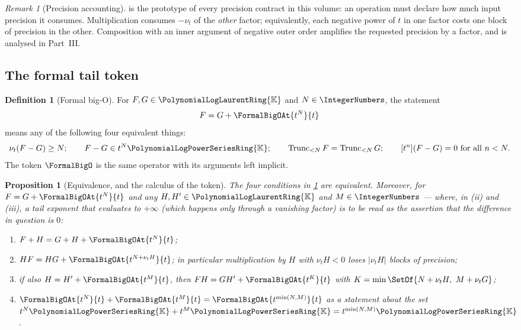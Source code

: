 \documentclass[11pt,oneside]{article}
\theoremstyle{plain}
\newtheorem{proposition}[theorem]{Proposition}
\theoremstyle{definition}
\newtheorem{definition}[theorem]{Definition}
\theoremstyle{remark}
\newtheorem{remark}[theorem]{Remark}
\newcommand{\K}{\mathbb{K}}
\newcommand{\PLpow}{\PolynomialLogPowerSeriesRing{\K}}   %
\newcommand{\PLlau}{\PolynomialLogLaurentRing{\K}}       %
\newcommand{\ordt}{\nu_{t}}                              %
\newcommand{\Trunc}[2]{\operatorname{Trunc}_{<#2}#1}     %
\begin{document}
\begin{remark}[Precision accounting]
\label{plt:rmk:trunc-precision}
 is the prototype of every precision contract in
this volume: an operation must declare how much input precision it consumes.
Multiplication consumes \(-\ordt\) of the \emph{other} factor; equivalently,
each negative power of \(t\) in one factor costs one block of precision in the
other.  Composition with an inner argument of negative outer order amplifies
the requested precision by a factor, and is analysed in Part~III.
\end{remark}

\subsection{The formal tail token}
\label{plt:sec:trunc-formal-o}

\begin{definition}[Formal big-O]
\label{plt:def:trunc-formal-o}
For \(F,G\in\PLlau\) and \(N\in\IntegerNumbers\), the statement
\begin{equation}\label{plt:eq:trunc-formal-o}
  F=G+\FormalBigOAt{t^N}{t}
\end{equation}
means any of the following four equivalent things:
\[
  \ordt(F-G)\ge N;
  \qquad
  F-G\in t^N\PLpow;
  \qquad
  \Trunc{F}{N}=\Trunc{G}{N};
  \qquad
  [t^n](F-G)=0\ \text{for all }n<N.
\]
The token \(\FormalBigO\) is the same operator with its arguments left
implicit.
\end{definition}

\begin{proposition}[Equivalence, and the calculus of the token]
\label{plt:prop:trunc-formal-o}
The four conditions in \cref{plt:def:trunc-formal-o} are equivalent.
Moreover, for \(F=G+\FormalBigOAt{t^N}{t}\) and any \(H,H'\in\PLlau\) and
\(M\in\IntegerNumbers\) --- where, in \textup{(ii)} and \textup{(iii)}, a tail
exponent that evaluates to \(+\infty\) (which happens only through a vanishing
factor) is to be read as the assertion that the difference in question is
\(0\):
\begin{enumerate}[label=\textup{(\roman*)}]
\item \(F+H=G+H+\FormalBigOAt{t^N}{t}\);
\item \(HF=HG+\FormalBigOAt{t^{N+\ordt H}}{t}\); in particular multiplication
  by \(H\) with \(\ordt H<0\) \emph{loses} \(|\ordt H|\) blocks of precision;
\item if also \(H=H'+\FormalBigOAt{t^{M}}{t}\), then
  \(FH=GH'+\FormalBigOAt{t^{K}}{t}\) with
  \(K=\min\SetOf{N+\ordt H,\ M+\ordt G}\);
\item \(\FormalBigOAt{t^N}{t}+\FormalBigOAt{t^M}{t}
  =\FormalBigOAt{t^{\min(N,M)}}{t}\) as a statement about the set
  \(t^N\PLpow+t^M\PLpow=t^{\min(N,M)}\PLpow\).
\end{enumerate}
\end{proposition}
\end{document}
